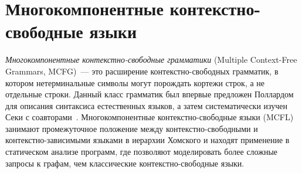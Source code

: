 \setchapterpreamble[u]{\margintoc}
\chapter{Многокомпонентные контекстно-свободные языки}
\label{chpt:MCFG}



\emph{Многокомпонентные контекстно-свободные грамматики} (Multiple Context-Free Grammars, MCFG)~--- это расширение контекстно-свободных грамматик, в котором нетерминальные символы могут порождать кортежи строк, а не отдельные строки.
Данный класс грамматик был впервые предложен Поллардом~\cite{pollard1984generalized} для описания синтаксиса естественных языков, а затем систематически изучен Секи с соавторами~\cite{SEKI1991191}.
Многокомпонентные контекстно-свободные языки (MCFL) занимают промежуточное положение между контекстно-свободными и контекстно-зависимыми языками в иерархии Хомского и находят применение в статическом анализе программ, где позволяют моделировать более сложные запросы к графам, чем классические контекстно-свободные языки.






